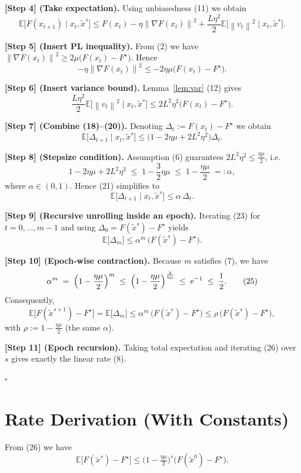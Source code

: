 \documentclass{article}
\newcommand{\E}{\mathbb{E}}
\newcommand{\norm}[1]{\left\|#1\right\|}
\begin{document}
\textbf{[Step 4] (Take expectation).}  
Using unbiasedness (11) we obtain
\[
\E\!\bigl[F(x_{t+1})\mid x_t,\tilde{x}^{s}\bigr]
\le F(x_t)-\eta\norm{\nabla F(x_t)}^{2}
   +\frac{L\eta^{2}}{2}\E\!\bigl[\norm{v_t}^{2}\mid x_t,\tilde{x}^{s}\bigr].
\tag{18}
\]

\textbf{[Step 5] (Insert PL inequality).}  
From (2) we have $\norm{\nabla F(x_t)}^{2}\ge 2\mu\bigl(F(x_t)-F^{\star}\bigr)$. Hence
\[
-\eta\norm{\nabla F(x_t)}^{2}
\le -2\eta\mu\bigl(F(x_t)-F^{\star}\bigr).
\tag{19}
\]

\textbf{[Step 6] (Insert variance bound).}  
Lemma~\ref{lem:var} (12) gives
\[
\frac{L\eta^{2}}{2}\E\!\bigl[\norm{v_t}^{2}\mid x_t,\tilde{x}^{s}\bigr]
\le 2L^{2}\eta^{2}\bigl(F(x_t)-F^{\star}\bigr).
\tag{20}
\]

\textbf{[Step 7] (Combine (18)–(20)).}  
Denoting $\Delta_t:=F(x_t)-F^{\star}$ we obtain
\[
\E\!\bigl[\Delta_{t+1}\mid x_t,\tilde{x}^{s}\bigr]
\le\bigl(1-2\eta\mu+2L^{2}\eta^{2}\bigr)\Delta_t.
\tag{21}
\]

\textbf{[Step 8] (Stepsize condition).}  
Assumption (6) guarantees $2L^{2}\eta^{2}\le\frac{\eta\mu}{2}$, i.e.
\[
1-2\eta\mu+2L^{2}\eta^{2}\;\le\;1-\frac{3}{2}\eta\mu
\;\le\;1-\frac{\eta\mu}{2}\;=: \alpha,
\tag{22}
\]
where $\alpha\in(0,1)$.  Hence (21) simplifies to
\[
\E\!\bigl[\Delta_{t+1}\mid x_t,\tilde{x}^{s}\bigr]\le \alpha\,\Delta_t.
\tag{23}
\]

\textbf{[Step 9] (Recursive unrolling inside an epoch).}  
Iterating (23) for $t=0,\dots,m-1$ and using $\Delta_0=F(\tilde{x}^{s})-F^{\star}$ yields
\[
\E\!\bigl[\Delta_{m}\bigr]\le \alpha^{m}\,\bigl(F(\tilde{x}^{s})-F^{\star}\bigr).
\tag{24}
\]

\textbf{[Step 10] (Epoch‑wise contraction).}  
Because $m$ satisfies (7), we have
\[
\alpha^{m}\;=\;\Bigl(1-\frac{\eta\mu}{2}\Bigr)^{m}
\;\le\;\Bigl(1-\frac{\eta\mu}{2}\Bigr)^{\frac{2}{\eta\mu}}
\;\le\;e^{-1}\;\le\;\frac12.
\tag{25}
\]
Consequently,
\[
\E\!\bigl[F(\tilde{x}^{s+1})-F^{\star}\bigr]
=\E\!\bigl[\Delta_{m}\bigr]
\le \alpha^{m}\,\bigl(F(\tilde{x}^{s})-F^{\star}\bigr)
\le \rho\,\bigl(F(\tilde{x}^{s})-F^{\star}\bigr),
\tag{26}
\]
with $\rho:=1-\frac{\eta\mu}{2}$ (the same $\alpha$).  

\textbf{[Step 11] (Epoch recursion).}  
Taking total expectation and iterating (26) over $s$ gives exactly the linear rate (8).

\hfill $\square$

\section*{Rate Derivation (With Constants)}
From (26) we have
\[
\E\!\bigl[F(\tilde{x}^{s})-F^{\star}\bigr]
\le \bigl(1-\tfrac{\eta\mu}{2}\bigr)^{s}\bigl(F(\tilde{x}^{0})-F^{\star}\bigr).
\]
\end{document}
